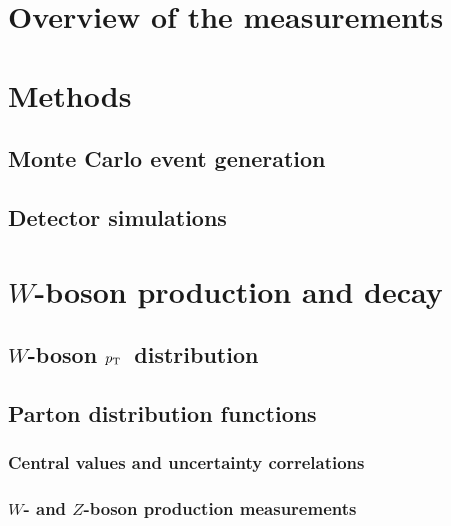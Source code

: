 \documentclass[epj]{svjour}
\newcommand*{\pT}{\ensuremath{p_{\scriptsize\textrm{T}}}}
\begin{document}
\section{Overview of the measurements}
\label{sec:overview}


\section{Methods}
\label{sec:methods}


\subsection{Monte Carlo event generation}
\label{sec:generators}


\subsection{Detector simulations}
\label{sec:simulation}


\section{$W$-boson production and decay}
\label{sec:production}


\subsection{$W$-boson \pT~distribution}
\label{sec:corrPTW}


\subsection{Parton distribution functions} 

\subsubsection{Central values and uncertainty correlations}
\label{sec:corrPDF}


\subsubsection{$W$- and $Z$-boson production measurements}
\label{sec:PDFWZ}

\end{document}
